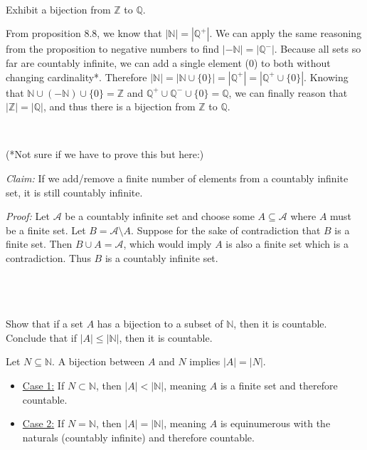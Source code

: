 \documentclass{article}
\begin{document}
\
\hline
\section{}

\begin{problem*}
Exhibit a bijection from $\mathbb{Z}$ to $\mathbb{Q}$.
\end{problem*}

From proposition 8.8, we know that $|\mathbb{N} |=|\mathbb{Q}^{+} |$. We can apply the same reasoning from the proposition to negative numbers to find $|-\mathbb{N} |=|\mathbb{Q}^{-} |$. Because all sets so far are countably infinite, we can add a single element (0) to both without changing cardinality*. Therefore $|\mathbb{N} |=|\mathbb{N} \cup \{0\} |=|\mathbb{Q}^{+} |=|\mathbb{Q}^{+} \cup \{0\} |$. Knowing that $\mathbb{N} \cup ( -\mathbb{N}) \cup \{0\} =\mathbb{Z}$ and $\mathbb{Q}^{+} \cup \mathbb{Q}^{-} \cup \{0\} =\mathbb{Q}$, we can finally reason that $|\mathbb{Z} |=|\mathbb{Q} |$, and thus there is a bijection from $\mathbb{Z}$ to $\mathbb{Q}$.

\

(*Not sure if we have to prove this but here:)

\textit{Claim: }If we add/remove a finite number of elements from a countably infinite set, it is still countably infinite. 

\textit{Proof: }Let $\mathcal{A}$ be a countably infinite set and choose some $A\subseteq \mathcal{A}$ where $A$ must be a finite set. Let $B=\mathcal{A}\setminus A$. Suppose for the sake of contradiction that $B$ is a finite set. Then $B\cup A =\mathcal{A}$, which would imply $A$ is also a finite set which is a contradiction. Thus $B$ is a countably infinite set.

\
\hline
\section{}

\begin{problem*}
Show that if a set $A$ has a bijection to a subset of $\mathbb{N}$, then it is countable. Conclude that if $|A|\le |\mathbb{N}|$, then it is countable. 
\end{problem*}

Let $N\subseteq \mathbb{N}$. A bijection between $A$ and $N$ implies $|A|=|N|$. 
\begin{itemize}
\item \underline{Case 1:} If $N\subset \mathbb{N}$, then $|A|< |\mathbb{N} |$, meaning $A$ is a finite set and therefore countable. 
\item \underline{Case 2:} If $N=\mathbb{N}$, then $|A|=|\mathbb{N} |$, meaning $A$ is equinumerous with the naturals (countably infinite) and therefore countable. 
\end{itemize}
\end{document}

